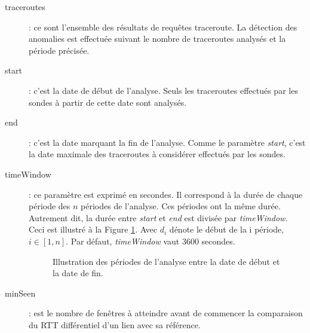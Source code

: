\begin{description}
	\item[traceroutes] : ce sont l'ensemble des résultats de requêtes traceroute. La détection des anomalies est effectuée suivant le nombre de traceroutes analysés et la période précisée. 
	\item[start] : c'est la date de début de l'analyse. Seuls les traceroutes effectués par les sondes  à partir de cette date sont analysés.
	\item[end]  : c'est la date marquant la fin de l'analyse. Comme le paramètre \textit{start}, c'est la date maximale des  traceroutes à considérer effectués par les sondes.
	\item[timeWindow]:  ce paramètre est exprimé en secondes. Il correspond à la durée de chaque période des $n$ périodes de l'analyse. Ces périodes ont la même durée. Autrement dit, la durée entre   \textit{start} et \textit{end} est divisée par \textit{timeWindow}. Ceci est illustré à la Figure  \ref{fig:timing_tex_}. Avec $d_i$ dénote le début de la i période,  $i \in [1,n]$. Par défaut, \textit{timeWindow} vaut $ 3600 $ secondes. 
	\begin{figure}[h]
		\centering
		\captionsetup{justification=centering}
		
		\caption{Illustration des périodes de l'analyse entre la date de début et la date de fin.}
		\label{fig:timing_tex_}
	\end{figure}
	\item[minSeen] : est le nombre de fenêtres à atteindre avant de commencer la comparaison du RTT différentiel d'un lien avec sa référence. 
	

\end{description}
